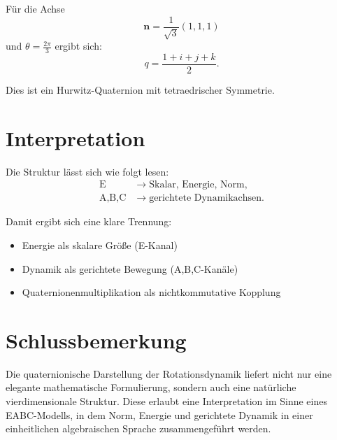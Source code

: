 \documentclass[11pt]{article}
\begin{document}
	Für die Achse
	\begin{equation}
		\mathbf n = \frac{1}{\sqrt3}(1,1,1)
	\end{equation}
	und $\theta = \frac{2\pi}{3}$ ergibt sich:
	\begin{equation}
		q = \frac{1+i+j+k}{2}.
	\end{equation}
	
	Dies ist ein Hurwitz-Quaternion mit tetraedrischer Symmetrie.
	
	\section{Interpretation}
	
	Die Struktur lässt sich wie folgt lesen:
	\begin{align}
		\text{E} &\rightarrow \text{Skalar, Energie, Norm},\\
		\text{A,B,C} &\rightarrow \text{gerichtete Dynamikachsen}.
	\end{align}
	
	Damit ergibt sich eine klare Trennung:
	\begin{itemize}
		\item Energie als skalare Größe (E-Kanal)
		\item Dynamik als gerichtete Bewegung (A,B,C-Kanäle)
		\item Quaternionenmultiplikation als nichtkommutative Kopplung
	\end{itemize}
	
	\section{Schlussbemerkung}
	
	Die quaternionische Darstellung der Rotationsdynamik liefert nicht nur eine elegante mathematische Formulierung, sondern auch eine natürliche vierdimensionale Struktur. Diese erlaubt eine Interpretation im Sinne eines EABC-Modells, in dem Norm, Energie und gerichtete Dynamik in einer einheitlichen algebraischen Sprache zusammengeführt werden.
	
\end{document}
